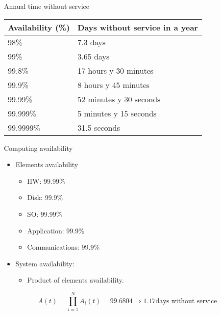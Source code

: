 \begin{frame}{Annual time without service}
\begin{center}
{\small
\begin{tabular}{|l|l|}
\hline
Availability (\%) & Days without service in a year\\
\hline
\hline
98\% & 7.3 days\\
\hline
99\% & 3.65 days\\
\hline
99.8\% & 17 hours y 30 minutes\\
\hline
99.9\% & 8 hours y 45 minutes\\
\hline
99.99\% & 52 minutes y 30 seconds\\
\hline
99.999\% & 5 minutes y 15 seconds\\
\hline
99.9999\% & 31.5 seconds\\
\hline
\end{tabular}
}
\end{center}
\end{frame}

\begin{frame}{Computing availability}
\begin{itemize}
  \item Elements availability
    \begin{itemize}
      \item HW: 99.99\%
      \item Disk: 99.9\%
      \item SO: 99.99\%
      \item Application: 99.9\%
      \item Communications: 99.9\%
    \end{itemize}

  \item System availability:
    \begin{itemize}
      \item Product of elements availability.
    \end{itemize}
\end{itemize}
\begin{equation*}
A(t) = \prod_{i=1}^{N} A_i(t) = 99.6804 \Rightarrow 1.17 \text{days without service}
\end{equation*}
\end{frame}


